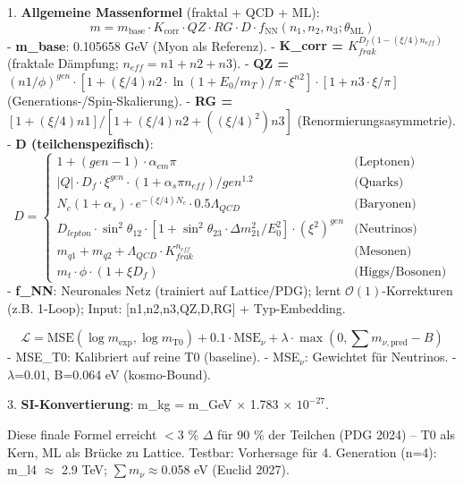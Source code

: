 	1. \textbf{Allgemeine Massenformel} (fraktal + QCD + ML):
	\[
	\boxed{m = m_{\text{base}} \cdot K_{\text{corr}} \cdot QZ \cdot RG \cdot D \cdot f_{\text{NN}}(n_1, n_2, n_3; \theta_{\text{ML}})}
	\]
	- \textbf{m\_base}: 0.105658 GeV (Myon als Referenz).
	- \textbf{K\_corr = $K_{frak}^{D_f (1 - (\xi/4) n_{eff})}$} (fraktale Dämpfung; $n_{eff} = n1 + n2 + n3$).
	- \textbf{QZ = $(n1 / \phi)^{gen} \cdot [1 + (\xi/4) n2 \cdot \ln(1 + E_0 / m_T) / \pi \cdot \xi^{n2}] \cdot [1 + n3 \cdot \xi / \pi]$} (Generations-/Spin-Skalierung).
	- \textbf{RG = $[1 + (\xi/4) n1] / [1 + (\xi/4) n2 + ((\xi/4)^2) n3]$} (Renormierungsasymmetrie).
	- \textbf{D (teilchenspezifisch)}:
	\[
	D =
	\begin{cases}
		1 + (gen - 1) \cdot \alpha_{em} \pi & \text{(Leptonen)} \\
		|Q| \cdot D_f \cdot \xi^{gen} \cdot (1 + \alpha_s \pi n_{eff}) / gen^{1.2} & \text{(Quarks)} \\
		N_c (1 + \alpha_s) \cdot e^{-(\xi/4) N_c} \cdot 0.5 \Lambda_{QCD} & \text{(Baryonen)} \\
		D_{lepton} \cdot \sin^2 \theta_{12} \cdot [1 + \sin^2 \theta_{23} \cdot \Delta m^2_{21} / E_0^2] \cdot (\xi^2)^{gen} & \text{(Neutrinos)} \\
		m_{q1} + m_{q2} + \Lambda_{QCD} \cdot K_{frak}^{n_{eff}} & \text{(Mesonen)} \\
		m_t \cdot \phi \cdot (1 + \xi D_f) & \text{(Higgs/Bosonen)}
	\end{cases}
	\]
	- \textbf{f\_NN}: Neuronales Netz (trainiert auf Lattice/PDG); lernt $\mathcal{O}(1)$-Korrekturen (z.B. 1-Loop); Input: [n1,n2,n3,QZ,D,RG] + Typ-Embedding.
	
	\[
	\mathcal{L} = \text{MSE}(\log m_{\exp}, \log m_{\text{T0}}) + 0.1 \cdot \text{MSE}_{\nu} + \lambda \cdot \max(0, \sum m_{\nu, \text{pred}} - B)
	\]
	- MSE\_T0: Kalibriert auf reine T0 (baseline).
	- MSE$_{\nu}$: Gewichtet für Neutrinos.
	- $\lambda$=0.01, B=0.064 eV (kosmo-Bound).
	
	3. \textbf{SI-Konvertierung}: m\_kg = m\_GeV $\times$ 1.783 $\times$ $10^{-27}$.
	
	Diese finale Formel erreicht $<$3 \% $\Delta$ für 90 \% der Teilchen (PDG 2024) – T0 als Kern, ML als Brücke zu Lattice. Testbar: Vorhersage für 4. Generation (n=4): m\_l4 $\approx$ 2.9 TeV; $\sum m_{\nu} \approx$0.058 eV (Euclid 2027).
	
